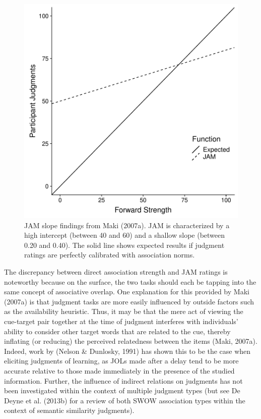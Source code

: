 \documentclass[english,,man]{apa6}
\begin{document}
\begin{figure}
\centering
\includegraphics{max_buch_JOL_files/figure-latex/makislope-1.pdf}
\caption{\label{fig:makislope}JAM slope findings from Maki (2007a). JAM is characterized by a high intercept (between 40 and 60) and a shallow slope (between 0.20 and 0.40). The solid line shows expected results if judgment ratings are perfectly calibrated with association norms.}
\end{figure}

The discrepancy between direct association strength and JAM ratings is noteworthy because on the surface, the two tasks should each be tapping into the same concept of associative overlap. One explanation for this provided by Maki (2007a) is that judgment tasks are more easily influenced by outside factors such as the availability heuristic. Thus, it may be that the mere act of viewing the cue-target pair together at the time of judgment interferes with individuals' ability to consider other target words that are related to the cue, thereby inflating (or reducing) the perceived relatedness between the items (Maki, 2007a). Indeed, work by (Nelson \& Dunlosky, 1991) has shown this to be the case when eliciting judgments of learning, as JOLs made after a delay tend to be more accurate relative to those made immediately in the presence of the studied information. Further, the influence of indirect relations on judgments has not been investigated within the context of multiple judgment types (but see De Deyne et al. (2013b) for a review of both SWOW association types within the context of semantic similarity judgments).
\end{document}
